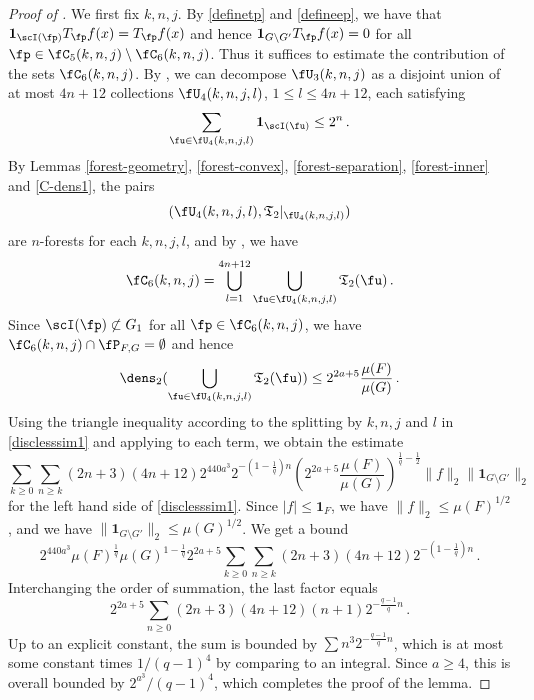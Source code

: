 \begin{proof}[Proof of ]
    \leanok

    We first fix $k,n, j$.
    By \eqref{definetp} and \eqref{defineep}, we have that
    $\mathbf{1}_{\scI(\fp)} T_{\fp}f(x) = T_{\fp}f(x)$ and hence $\mathbf{1}_{G \setminus G'} T_{\fp}f(x)= 0$ for all $\fp \in \fC_5(k,n,j) \setminus \fC_6(k,n,j)$.
    Thus it suffices to estimate the contribution of the sets $\fC_6(k,n,j)$. By , we can decompose $\fU_3(k,n,j)$ as a disjoint union of at most $4n + 12$ collections $\fU_4(k,n,j,l)$, $1 \le l \le 4n+12$, each satisfying
    $$
        \sum_{\fu \in \fU_4(k,n,j,l)} \mathbf{1}_{\scI(\fu)} \le 2^n\,.
    $$
    By Lemmas \ref{forest-geometry}, \ref{forest-convex}, \ref{forest-separation}, \ref{forest-inner} and \ref{C-dens1}, the pairs
    $$
        (\fU_4(k,n,j,l), \mathfrak{T}_2|_{\fU_4(k,n,j,l)})
    $$
    are $n$-forests for each $k,n,j,l$, and by , we have
    $$
        \fC_6(k,n,j) = \bigcup_{l = 1}^{4n + 12} \bigcup_{\fu \in \fU_4(k,n,j,l)} \mathfrak{T}_2(\fu)\,.
    $$
    Since $\scI(\fp) \not\subset G_1$ for all $\fp \in \fC_6(k,n,j)$, we have $\fC_6(k,n,j) \cap \fP_{F,G} = \emptyset$ and hence
    $$
        \dens_2(\bigcup_{\fu \in \fU_4(k,n,j,l)} \mathfrak{T}_2(\fu)) \le 2^{2a + 5} \frac{\mu(F)}{\mu(G)}\,.
    $$
    Using the triangle inequality according to the splitting by $k,n,j$ and $l$ in \eqref{disclesssim1} and applying  to each term, we obtain the estimate
    $$
        \sum_{k \ge 0}\sum_{n \ge k} (2n+3)(4n+12) 2^{440a^3}2^{-(1-\frac{1}{q})n}(2^{2a+5} \frac{\mu(F)}{\mu(G)})^{\frac{1}{q} - \frac{1}{2}} \|f\|_2 \|\mathbf{1}_{G\setminus G'}\|_2
    $$
    for the left hand side of \eqref{disclesssim1}. Since $|f| \le \mathbf{1}_F$, we have $\|f\|_2 \le \mu(F)^{1/2}$, and we have $\|\mathbf{1}_{G\setminus G'}\|_2 \le \mu(G)^{1/2}$.
    We get a bound
    $$
        2^{440a^3} \mu(F)^{\frac{1}{q}} \mu(G)^{1
        -\frac{1}{q}} 2^{2a+5}\sum_{k \ge 0}\sum_{n \ge k}(2n+3)(4n+12) 2^{-(1-\frac{1}{q})n}\,.
    $$ %
    Interchanging the order of summation, the last factor equals
    $$
        2^{2a+5} \sum_{n \ge 0} (2n+3)(4n+12) (n+1) 2^{-\frac{q-1}{q}n}\,.
    $$
    Up to an explicit constant, the sum is bounded by $\sum n^3 2^{-\frac{q-1}{q}n}$, which is at most
    some constant times $1/(q-1)^4$ by comparing to an integral. Since $a \ge 4$, this is overall bounded by $2^{a^3}/(q-1)^4$,
    which completes the proof of the lemma.
\end{proof}

